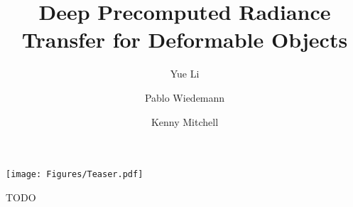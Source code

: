 \documentclass[sigconf]{acmart}
\begin{document}
\title{Deep Precomputed Radiance Transfer for Deformable Objects}

\author{Yue Li}

\author{Pablo Wiedemann}

\author{Kenny Mitchell}


\renewcommand{\shortauthors}{Li, Wiedemann,Mitchell}


%
\begin{teaserfigure}
  \centering
  \texttt{[image: Figures/Teaser.pdf]}
  \caption{TODO}
\end{teaserfigure}
\maketitle
%
%

%

%

%

%

%


%
%
\end{document}
